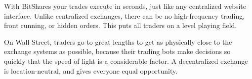 With BitShares your trades execute in seconds, just like any centralized
website interface. Unlike centralized exchanges, there can be no
high-frequency trading, front running, or hidden orders. This puts all traders
on a level playing field.

On Wall Street, traders go to great lengths to get as physically close to the
exchange systems as possible, because their trading bots make decisions so
quickly that the speed of light is a considerable factor. A decentralized
exchange is location-neutral, and gives everyone equal opportunity.
